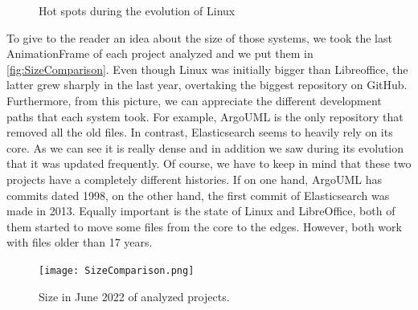 \begin{figure}[ht]
    \caption{Hot spots during the evolution of Linux} 
    \label{fig:Linux_V7}
\end{figure}

\clearpage
To give to the reader an idea about the size of those systems, we took the last AnimationFrame of each project analyzed and we put them in \autoref{fig:SizeComparison}. Even though Linux was initially bigger than Libreoffice, the latter grew sharply in the last year, overtaking the biggest repository on GitHub. Furthermore, from this picture, we can appreciate the different development paths that each system took. For example, ArgoUML is the only repository that removed all the old files. In contrast, Elasticsearch seems to heavily rely on its core. As we can see it is really dense and in addition we saw during its evolution that it was updated frequently. Of course, we have to keep in mind that these two projects have a completely different histories. If on one hand, ArgoUML has commits dated 1998, on the other hand, the first commit of Elasticsearch was made in 2013. Equally important is the state of Linux and LibreOffice, both of them started to move some files from the core to the edges. However, both work with files older than 17 years. 

\begin{figure}[h!]
    \centering
    \texttt{[image: SizeComparison.png]}
    \caption{Size in June 2022 of analyzed projects.} 
    \label{fig:SizeComparison}
\end{figure}
